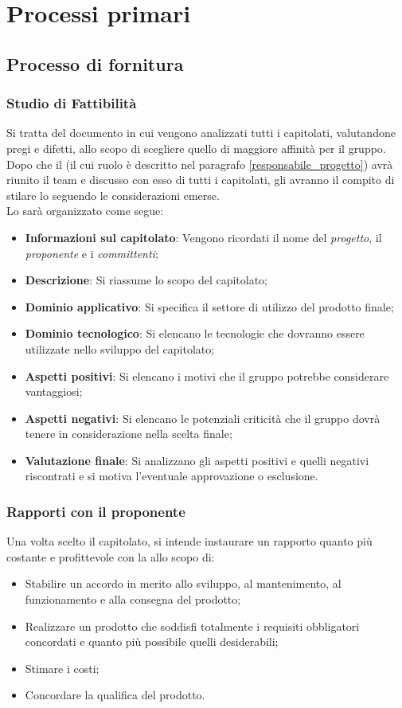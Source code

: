 \section{Processi primari}
\subsection{Processo di fornitura}

\subsubsection{Studio di Fattibilità}
Si tratta del documento in cui vengono analizzati tutti i capitolati, valutandone pregi e difetti, allo scopo di scegliere quello di maggiore affinità per il gruppo.
Dopo che il \RdP{} (il cui ruolo è descritto nel paragrafo \ref{responsabile_progetto}) avrà riunito il team e discusso con esso di tutti i capitolati, gli \anas{} avranno il compito di stilare lo \SdF{} seguendo le considerazioni emerse.\\
Lo \SdF{} sarà organizzato come segue:
\begin{itemize}
	\item \textbf{Informazioni sul capitolato}:
	Vengono ricordati il nome del \emph{progetto}, il \textit{proponente} e i \textit{committenti};
	\item \textbf{Descrizione}:
	Si riassume lo scopo del capitolato;
	\item \textbf{Dominio applicativo}:
	Si specifica il settore di utilizzo del prodotto finale;
	\item \textbf{Dominio tecnologico}:
	Si elencano le tecnologie che dovranno essere utilizzate nello sviluppo del capitolato;
	\item \textbf{Aspetti positivi}:
	Si elencano i motivi che il gruppo potrebbe considerare vantaggiosi;
	\item \textbf{Aspetti negativi}:
	Si elencano le potenziali criticità che il gruppo dovrà tenere in considerazione nella scelta finale;
	\item \textbf{Valutazione finale}:
	Si analizzano gli aspetti positivi e quelli negativi riscontrati e si motiva l'eventuale approvazione o esclusione.
\end{itemize}

\subsubsection{Rapporti con il proponente}
Una volta scelto il capitolato, si intende instaurare un rapporto quanto più costante e profittevole con la \proponente{} allo scopo di:
\begin{itemize}
	\item Stabilire un accordo in merito allo sviluppo, al mantenimento, al funzionamento e alla consegna del prodotto;
	\item Realizzare un prodotto che soddisfi totalmente i requisiti obbligatori concordati e quanto più possibile quelli desiderabili;
	\item Stimare i costi;
	\item Concordare la qualifica del prodotto.
\end{itemize}

